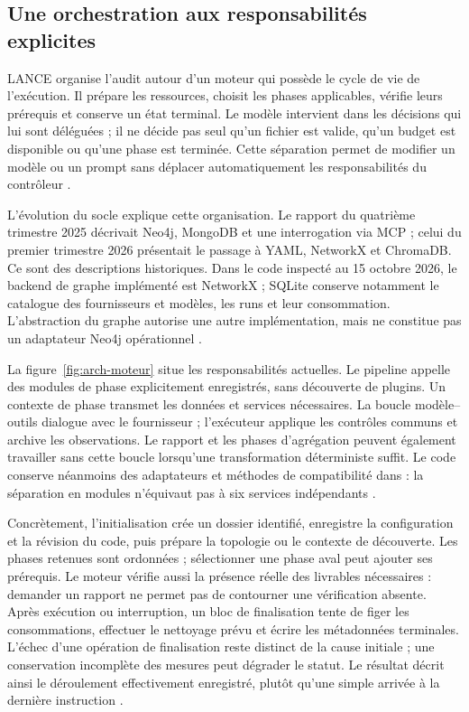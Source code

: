 \documentclass[11pt,a4paper]{article}
\DeclareRobustCommand{\code}[1]{{\small\path{#1}}}
\begin{document}
\subsection{Une orchestration aux responsabilités explicites}
LANCE organise l'audit autour d'un moteur qui possède le cycle de vie de
l'exécution. Il prépare les ressources, choisit les phases applicables,
vérifie leurs prérequis et conserve un état terminal. Le modèle intervient
dans les décisions qui lui sont déléguées ; il ne décide pas seul qu'un fichier
est valide, qu'un budget est disponible ou qu'une phase est terminée.
Cette séparation permet de modifier un modèle ou un prompt sans déplacer
automatiquement les responsabilités du contrôleur \cite{arch-pipeline,arch-runner}.

L'évolution du socle explique cette organisation. Le rapport du quatrième
trimestre 2025 décrivait Neo4j, MongoDB et une interrogation via MCP ; celui
du premier trimestre 2026 présentait le passage à YAML, NetworkX et ChromaDB.
Ce sont des descriptions historiques. Dans le code inspecté au 15 octobre
2026, le backend de graphe implémenté est NetworkX ; SQLite conserve notamment
le catalogue des fournisseurs et modèles, les runs et leur consommation.
L'abstraction du graphe autorise une autre implémentation, mais ne constitue
pas un adaptateur Neo4j opérationnel \cite{intro-q4,intro-q1,arch-graphe,arch-db}.

La figure~\ref{fig:arch-moteur} situe les responsabilités actuelles. Le pipeline
appelle des modules de phase explicitement enregistrés, sans découverte de
plugins. Un contexte de phase transmet les données et services nécessaires.
La boucle modèle--outils dialogue avec le fournisseur ; l'exécuteur applique
les contrôles communs et archive les observations. Le rapport et les phases
d'agrégation peuvent également travailler sans cette boucle lorsqu'une
transformation déterministe suffit. Le code conserve néanmoins des adaptateurs
et méthodes de compatibilité dans \code{Pipeline} : la séparation en modules
n'équivaut pas à six services indépendants \cite{arch-contexte,arch-dispatch}.

Concrètement, l'initialisation crée un dossier identifié, enregistre la
configuration et la révision du code, puis prépare la topologie ou le contexte
de découverte. Les phases retenues sont ordonnées ; sélectionner une phase
aval peut ajouter ses prérequis. Le moteur vérifie aussi la présence réelle
des livrables nécessaires : demander un rapport ne permet pas de contourner
une vérification absente. Après exécution ou interruption, un bloc de
finalisation tente de figer les consommations, effectuer le nettoyage prévu
et écrire les métadonnées terminales. L'échec d'une opération de finalisation
reste distinct de la cause initiale ; une conservation incomplète des mesures
peut dégrader le statut. Le résultat décrit ainsi le déroulement effectivement
enregistré, plutôt qu'une simple arrivée à la dernière instruction
\cite{arch-pipeline}.
\end{document}
